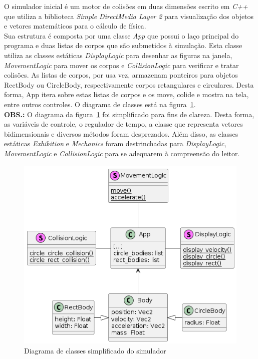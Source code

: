 \documentclass[11pt]{article}
\begin{document}
O simulador inicial é um motor de colisões em duas dimensões escrito em \textit{C++} que utiliza a biblioteca \textit{Simple DirectMedia Layer 2} para visualização dos objetos e vetores matemáticos para o cálculo de física. \\

Sua estrutura é composta por uma classe \textit{App} que possui o laço principal do programa e duas listas de corpos que são submetidos à simulação. Esta classe utiliza as classes estáticas \textit{DisplayLogic} para desenhar as figuras na janela, \textit{MovementLogic} para mover os corpos e \textit{CollisionLogic} para verificar e tratar colisões. As listas de corpos, por usa vez, armazenam ponteiros para objetos RectBody ou CircleBody, respectivamente corpos retangulares e circulares. Desta forma, App itera sobre estas listas de corpos e os move, colide e mostra na tela, entre outros controles. O diagrama de classes está na figura~\ref{fig:diagr_original}. \\

\textbf{OBS.:} O diagrama da figura~\ref{fig:diagr_original} foi simplificado para fins de clareza. Desta forma, as variáveis de controle, o regulador de tempo, a classe que representa vetores bidimensionais e diversos métodos foram desprezados. Além disso, as classes estáticas \textit{Exhibition} e \textit{Mechanics} foram destrinchadas para \textit{DisplayLogic}, \textit{MovementLogic} e \textit{CollisionLogic} para se adequarem à compreensão do leitor.

 \begin{figure}[h]
    \centering
    \includegraphics[scale=0.60]{figuras/diagr_original_simplificado.png}
    \caption{Diagrama de classes simplificado do simulador}
    \label{fig:diagr_original}
 \end{figure} 
\end{document}

